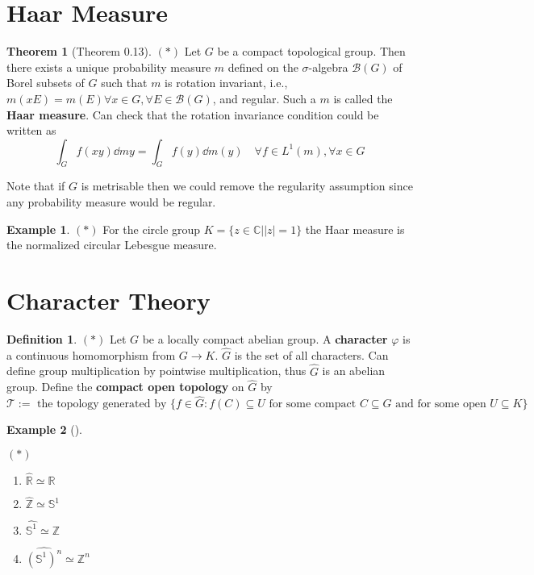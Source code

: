 \documentclass{article}
\theoremstyle{definition}
\newtheorem{thm}{Theorem}
\newtheorem{ex}{Example}
\newtheorem{dfn}{Definition}
\newenvironment{exs}[1][]{%
  \begin{ex}[#1]$ $\par\nobreak\ignorespaces
}{%
  \end{ex}
}
\newcommand{\CC}{\mathbb C}
\newcommand{\RR}{\mathbb R}
\renewcommand{\SS}{\mathbb S}
\newcommand{\T}{\mathcal T}
\newcommand{\ZZ}{\mathbb Z}
\begin{document}
\section{Haar Measure}

\begin{thm}[Theorem 0.13]
	$(*)$
	Let $G$ be a compact topological group.
	Then there exists a unique probability measure $m$ defined on the $\sigma$-algebra $\mathscr{B}(G)$ of Borel subsets of $G$ such that $m$ is rotation invariant, i.e., $m(x E) = m(E) \forall x \in G, \forall E \in \mathscr{B}(G)$, and regular. 
	Such a $m$ is called the \textbf{Haar measure}.
	Can check that the rotation invariance condition could be written as
	\[
		\int_G f(x y) \dd{m} y = \int_G f(y) \dd{m}(y) \quad \forall f \in L^1(m), \forall x \in G
	\]
\end{thm}

Note that if $G$ is metrisable then we could remove the regularity assumption since any probability measure would be regular.

\begin{ex}
	$(*)$
	For the circle group $K = \{z \in \CC| |z| = 1\}$ the Haar measure is the normalized circular Lebesgue measure.
\end{ex}

\section{Character Theory}

\begin{dfn}
	$(*)$
	Let $G$ be a locally compact abelian group.
	A \textbf{character} $\varphi$ is a continuous homomorphism from $G \to K$.
	$\widehat{G}$ is the set of all characters.
	Can define group multiplication by pointwise multiplication, thus $\widehat{G}$ is an abelian group.
	Define the \textbf{compact open topology} on $\widehat{G}$ by
	\[
		\T := \text{ the topology generated by } \{f \in \widehat{G}: f(C) \subseteq U \text{ for some compact } C \subseteq G \text{ and for some open } U \subseteq K\}
	\]
\end{dfn}

\begin{exs}
	$(*)$
	\begin{enumerate}
		\item $\widehat{\RR} \simeq \RR$

		\item $\widehat{\ZZ} \simeq \SS^1$

		\item $\widehat{\SS^1} \simeq \ZZ$

		\item $\widehat{(\SS^1)^n} \simeq \ZZ^n$
	\end{enumerate}
\end{exs}
\end{document}
